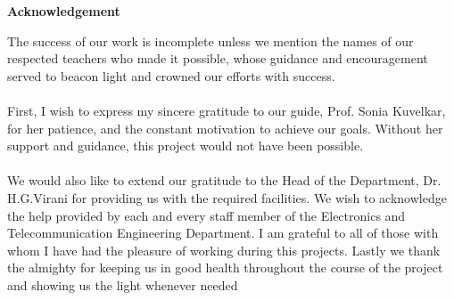 \begin{center}
\begin{huge}
\bfseries{Acknowledgement}\\
\end{huge}
\end{center}
\vspace{1cm}
The success of our work is incomplete unless we mention the names of our respected teachers who made it possible, whose guidance and encouragement served to beacon light and crowned our efforts with success.\\
\\
\noindent First, I wish to express my sincere gratitude to our guide, Prof. Sonia Kuvelkar, for her patience, and the constant motivation to achieve our goals. Without her support and guidance, this project would not have been possible.\\
\\
\noindent We would also like to extend our gratitude to the Head of the Department, Dr. H.G.Virani for providing us with the required facilities. We wish to acknowledge the help provided by each and every staff member of the Electronics and Telecommunication Engineering Department. I am grateful to all of those with whom I have had the pleasure of working during this projects. Lastly we thank the almighty for keeping us in good health throughout the course of the project and showing us the light whenever needed

\noindent